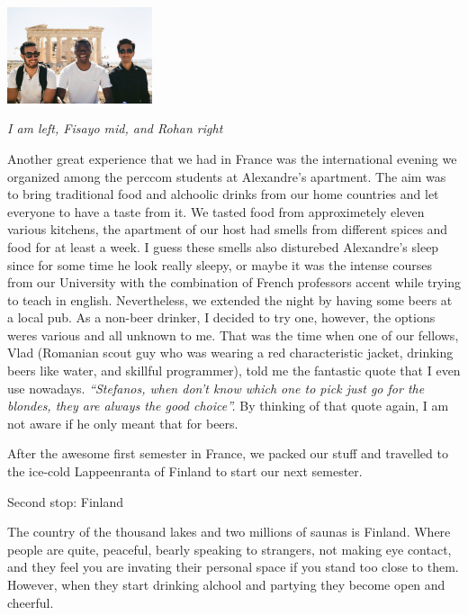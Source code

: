 \documentclass[10pt,a4paper]{article} %
\newcommand{\NewsItem}[1]{ %
\usefont{T1}{fvs}{n}{n} %
\vspace{24pt}\large #1\vspace{3pt} %
\par \normalsize \normalfont}
\begin{document}
\begin{multicols}{3}
\begin{center}
	\includegraphics[width=0.32\textwidth]{media/stef_fisayo_rohan.jpg}
	\par\textit{I am left, Fisayo mid, and Rohan right}
\end{center}


Another great experience that we had in France was the international evening 
we organized among the {\sc perccom} students at Alexandre's apartment. 
The aim was to bring traditional food and alchoolic drinks from our home countries 
and let everyone to have a taste from it. 
We tasted food from approximetely eleven various kitchens, the apartment of our 
host had smells from different spices and food for at least a week. 
I guess these smells also disturebed Alexandre's sleep since for some time he look 
really sleepy, or maybe it was the intense courses from our University with the 
combination of French professors accent while trying to teach in english.  
Nevertheless, we extended the night by having some beers at a local pub. 
As a non-beer drinker, I decided to try one, however, the options weres various 
and all unknown to me. 
That was the time when one of our fellows, Vlad (Romanian scout guy who was wearing a 
red characteristic jacket, drinking beers like water, and skillful programmer), 
told me the fantastic quote that I even use nowadays. 
\textit{``Stefanos, when don't know which one to pick just go for the blondes, 
	they are always the good choice''.} 
By thinking of that quote again, I am not aware if he only meant that for beers.


After the awesome first semester in France, we packed our stuff and travelled 
to the ice-cold Lappeenranta of Finland to start our next semester.


\NewsItem{Second stop: Finland}
The country of the thousand lakes and two millions of saunas is Finland. 
Where people are quite, peaceful, bearly speaking to strangers, not making eye 
contact, and they feel you are invating their personal space if you stand too 
close to them. 
However, when they start drinking alchool and partying they become open and cheerful. 
   

\end{multicols}
\end{document}
